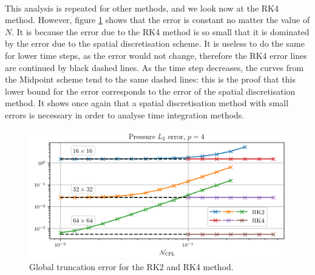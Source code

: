       \paragraph{}
      This analysis is repeated for other methods, and we look now at the RK4 method.
      However, figure \ref{fig:covo_rk2_rk4} shows that the error is constant no matter the value of $N$.
      It is because the error due to the RK4 method is so small that it is dominated by the error due to the spatial discretisation scheme.
      It is useless to do the same for lower time steps, as the error would not change, therefore the RK4 error lines are continued by black dashed lines.
      As the time step decreases, the curves from the Midpoint scheme tend to the same dashed lines: this is the proof that this lower bound for the error corresponds to the error of the spatial discretisation method.
      It shows once again that a spatial discretisation method with small errors is necessary in order to analyse time integration methods.

      \begin{figure}
        \centering
        \includegraphics{figures/covo_rk2_rk4.png}
        \caption{Global truncation error for the RK2 and RK4 method.}
        \label{fig:covo_rk2_rk4}
      \end{figure}

